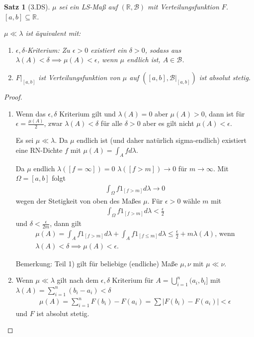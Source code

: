 \documentclass[]{article}
\newtheorem{theorem}{Satz}
\begin{document}
\begin{theorem}[3.DS]
	$\mu$ sei ein LS-Maß auf $(\mathbb{R}, \mathcal{B})$ mit Verteilungsfunktion $F$. $[a,b] \subseteq \mathbb{R}$.
	
	$\mu \ll \lambda$ ist äquivalent mit:
	\begin{enumerate}
		\item $\epsilon,\delta$-Kriterium: Zu $\epsilon > 0$ existiert ein $\delta > 0$, sodass aus $\lambda(A)< \delta \implies \mu(A) < \epsilon$, wenn $\mu$ endlich ist, $A \in \mathcal{B}$.
		
		\item $F|_{[a,b]}$ ist Verteilungsfunktion von $\mu$ auf $([a,b], \mathcal{B}|_{[a,b]})$ ist absolut stetig.
	\end{enumerate}
\end{theorem}
\begin{proof}
	\begin{enumerate}
		\item Wenn das $\epsilon,\delta$ Kriterium gilt und $\lambda(A)=0$ aber $\mu(A)>0$, dann ist für $\epsilon = \frac{\mu(A)}{2}$, zwar $\lambda(A) < \delta$ für alle $\delta > 0$ aber es gilt nicht $\mu(A) < \epsilon$.
		
		Es sei $\mu \ll \lambda$. Da $\mu$ endlich ist (und daher natürlich sigma-endlich) existiert eine RN-Dichte $f$ mit $\mu(A) = \int_A f d\lambda$.
		
		Da $\mu$ endlich $\lambda([f=\infty])=0$ $\lambda([f>m])\rightarrow 0$ für $m \rightarrow \infty$. Mit $\Omega = [a,b]$ folgt
		\begin{align*}
			\int_{\Omega} f 1_{[f>m]} d\lambda \rightarrow 0
		\end{align*}
		wegen der Stetigkeit von oben des Maßes $\mu$. Für $\epsilon > 0$ wähle $m$ mit
		\begin{align*}
			\int_{\Omega} f 1_{[f>m]} d\lambda < \frac{\epsilon}{2}
		\end{align*}
		und $\delta < \frac{\epsilon}{2m}$, dann gilt
		\begin{align*}
			\mu(A) = \int_A f 1_{[f>m]} d\lambda + \int_A f 1_{[f\leq m]} d\lambda \leq \frac{\epsilon}{2} + m \lambda(A) \text{, wenn}\\
			\lambda(A) < \delta \implies \mu(A) < \epsilon.
		\end{align*}
	
		Bemerkung: Teil 1) gilt für beliebige (endliche) Maße $\mu,\nu$ mit $\mu \ll \nu$.
		
		\item Wenn $\mu \ll \lambda$ gilt nach dem $\epsilon,\delta$ Kriterium für $A=\bigcup_{i=1}^{n} (a_i,b_i]$ mit $\lambda(A) = \sum_{i=1}^{n} (b_i - a_i) < \delta$
		\begin{align*}
			\mu(A) = \sum_{i=1}^{n} F(b_i) - F(a_i) = \sum |F(b_i) - F(a_i)| < \epsilon
		\end{align*}
		und $F$ ist absolut stetig.
		

\end{enumerate}
\end{proof}
\end{document}
